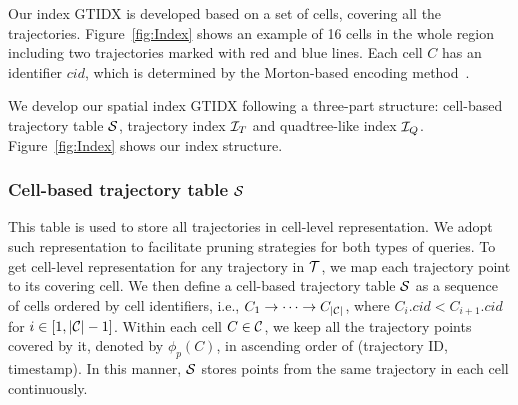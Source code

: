 \documentclass[10pt,conference,letterpaper]{IEEEtran}
\newcommand{\idxname}{GTIDX\xspace }
\newcommand{\alltraj}{{{\cal T}}\xspace}
\newcommand{\allcell}{{\cal C}\xspace}
\newcommand{\trajtable}{{\cal S}\xspace}
\newcommand{\trajindex}{{{\cal I}_T}\xspace}
\newcommand{\treeindex}{{{\cal I}_Q}\xspace}
\begin{document}
Our index \idxname is developed based on a set of cells, covering all the trajectories.
Figure~\ref{fig:Index} shows an example of 16 cells in the whole region including two trajectories marked with red and blue lines.
Each cell $C$ has an identifier $cid$, which is determined by the Morton-based encoding method~\cite{morton1966computer}.


We develop our spatial index \idxname following a three-part structure: cell-based trajectory table $\trajtable$, trajectory index $\trajindex$ and quadtree-like index $\treeindex$. Figure~\ref{fig:Index} shows our index structure.

\subsubsection{Cell-based trajectory table $\trajtable$}
This table is used to store all trajectories in cell-level representation. We adopt such representation to facilitate pruning strategies for both types of queries.
To get cell-level representation for any trajectory in $\alltraj$, we map each trajectory point to its covering cell.
We then define a cell-based trajectory table $\trajtable$ as a sequence of cells ordered by cell identifiers, i.e., $C_1\rightarrow\cdots\rightarrow C_{|\allcell|}$, where $C_i.cid < C_{i+1}.cid$ for $i\in[1,|\allcell|-1]$.
Within each cell $C\in\allcell$, we keep all the trajectory points covered by it, denoted by $\phi_p(C)$, in ascending order of (trajectory ID, timestamp).
In this manner, $\trajtable$ stores points from the same trajectory in each cell continuously.
\end{document}
